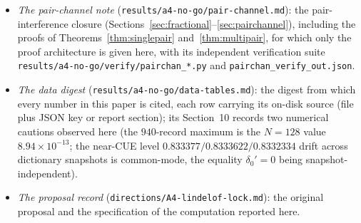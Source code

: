 \documentclass[11pt]{article}
\theoremstyle{plain}
\theoremstyle{definition}
\theoremstyle{remark}
\begin{document}
\begin{itemize}
  and~\ref{sec:capacity}, with their verification scripts and JSON outputs
  (\texttt{results/a4-no-go/verify/}).
\item \emph{The pair-channel note}
  (\texttt{results/a4-no-go/}\allowbreak\texttt{pair-}\allowbreak\texttt{channel.md}):
  the pair-interference closure
  (Sections~\ref{sec:fractional}--\ref{sec:pairchannel}), including the proofs
  of Theorems~\ref{thm:singlepair} and~\ref{thm:multipair}, for which only the
  proof architecture is given here, with its independent verification suite
  \texttt{results/a4-no-go/verify/}\allowbreak\texttt{pairchan\_*.py}
  and \texttt{pairchan\_}\allowbreak\texttt{verify\_}\allowbreak\texttt{out.json}.
\item \emph{The data digest} (\texttt{results/a4-no-go/data-tables.md}): the
  digest from which every number in this paper is cited, each row carrying its
  on-disk source (file plus JSON key or report section);
  its Section~10 records two numerical cautions observed here (the $940$-record
  maximum is the $N = 128$ value $8.94 \times 10^{-13}$; the near-CUE level
  $0.833377 / 0.8333622 / 0.8332334$ drift across dictionary snapshots is
  common-mode, the equality $\delta_0' = 0$ being snapshot-independent).
\item \emph{The proposal record} (\texttt{directions/A4-lindelof-lock.md}): the
  original proposal and the specification of the computation reported here.
\end{itemize}
\end{document}
